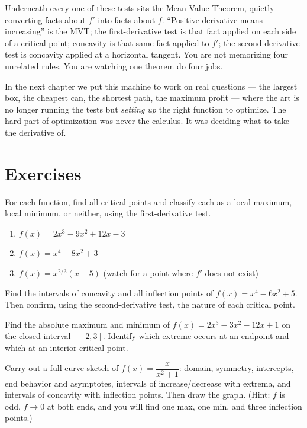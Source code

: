 Underneath every one of these tests sits the Mean Value Theorem, quietly
converting facts about $f'$ into facts about $f$. ``Positive derivative means
increasing'' is the MVT; the first-derivative test is that fact applied on each
side of a critical point; concavity is that same fact applied to $f'$; the
second-derivative test is concavity applied at a horizontal tangent. You are not
memorizing four unrelated rules. You are watching one theorem do four jobs.

In the next chapter we put this machine to work on real questions --- the largest
box, the cheapest can, the shortest path, the maximum profit --- where the art is
no longer running the tests but \emph{setting up} the right function to optimize.
The hard part of optimization was never the calculus. It was deciding what to take
the derivative of.

\section*{Exercises}

\begin{exercise}\label{ch16:exA}
For each function, find all critical points and classify each as a local maximum,
local minimum, or neither, using the first-derivative test.
\begin{enumerate}
\item $f(x)=2x^3-9x^2+12x-3$
\item $f(x)=x^4-8x^2+3$
\item $f(x)=x^{2/3}(x-5)$ \quad(watch for a point where $f'$ does not exist)
\end{enumerate}
\end{exercise}

\begin{exercise}\label{ch16:exB}
Find the intervals of concavity and all inflection points of
$f(x)=x^4-6x^2+5$. Then confirm, using the second-derivative test, the nature of
each critical point.
\end{exercise}

\begin{exercise}\label{ch16:exC}
Find the absolute maximum and minimum of $f(x)=2x^3-3x^2-12x+1$ on the closed
interval $[-2,3]$. Identify which extreme occurs at an endpoint and which at an
interior critical point.
\end{exercise}

\begin{exercise}\label{ch16:exD}
Carry out a full curve sketch of $f(x)=\dfrac{x}{x^2+1}$: domain, symmetry,
intercepts, end behavior and asymptotes, intervals of increase/decrease with
extrema, and intervals of concavity with inflection points. Then draw the graph.
(Hint: $f$ is odd, $f\to0$ at both ends, and you will find one max, one min, and
three inflection points.)
\end{exercise}

